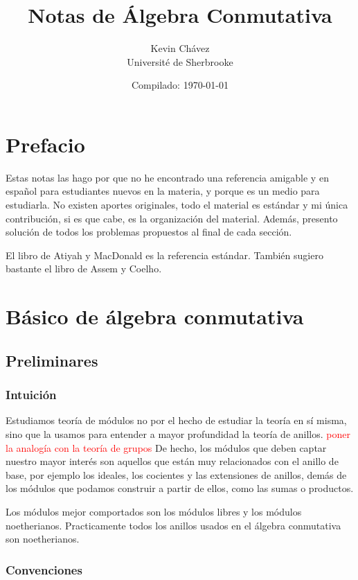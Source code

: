\documentclass[b5paper,10pt]{book}
\title{Notas de Álgebra Conmutativa}
\author{Kevin Chávez\\ Université de Sherbrooke}
\date{Compilado: \today}
\newcommand{\red}[1]{\textcolor{red}{#1}}
\theoremstyle{definition}
\begin{document}
\pagestyle{empty}
\maketitle 
\tableofcontents
\pagestyle{plain}

\chapter*{Prefacio}

Estas notas las hago por que no he encontrado una referencia
amigable y en español para estudiantes nuevos en la materia,
y porque es un medio para estudiarla.
No existen aportes originales, todo el material es estándar
y mi única contribución, si es que cabe, es la organización 
del material.
Además, presento solución de todos los problemas propuestos 
al final de cada sección.

El libro de Atiyah y MacDonald es la referencia estándar.
También sugiero bastante el libro de Assem y Coelho.

\chapter{Básico de álgebra conmutativa}

\section{Preliminares}

\subsection{Intuición}

Estudiamos teoría de módulos no por el hecho de estudiar la teoría en sí misma,
sino que la usamos para entender a mayor profundidad la teoría de anillos.
\red{poner la analogía con la teoría de grupos}
De hecho, los módulos que deben captar nuestro mayor interés 
son aquellos que están muy relacionados con el anillo de base,
por ejemplo los ideales, los cocientes y las extensiones de anillos,
demás de los módulos que podamos construir a partir de ellos, como las sumas o productos.

Los módulos mejor comportados son los módulos libres
y los módulos noetherianos.
Practicamente todos los anillos usados en el álgebra conmutativa son
noetherianos.

\subsection{Convenciones}
\end{document}
